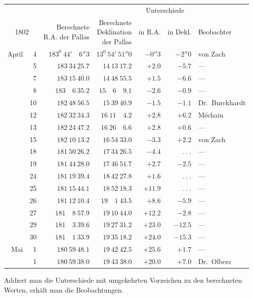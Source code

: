 \begin{center}
{\small\setlength{\tabcolsep}{3pt}
\begin{tabular}{r r|r|r|r|r|l}
\multicolumn{2}{c|}{}&&&\multicolumn{2}{c|}{Unterschiede}&\\
\multicolumn{2}{c|}{1802}&\shortstack{Berechnete\\R.A. der Pallas}&\shortstack{Berechnete\\Deklination\\der Pallas}&in R.A.&in Dekl.&Beobachter\\\hline
April&4&$183^0\ 44'\quad6''3$&$13^0\ 54'\ 51''0$&$-0''3$&$-2''0$&von Zach\\
&5&$183\ 34\ 25.7$&$14\ 13\ 17.2$&$+2.0$&$-5.7$&—\\
&7&$183\ 15\ 40.0$&$14\ 48\ 55.5$&$+1.5$&$-6.6$&—\\
&8&$183\quad6\ 35.2$&$15\quad6\quad9.1$&$-2.6$&$-0.9$&—\\
&10&$182\ 48\ 56.5$&$15\ 39\ 40.9$&$-1.5$&$-1.1$&Dr.\ Burckhardt\\
&12&$182\ 32\ 34.3$&$16\ 11\quad4.2$&$+2.8$&$+6.2$&Méchain\\
&13&$182\ 24\ 47.2$&$16\ 26\quad6.6$&$+2.8$&$+0.6$&—\\
&15&$182\ 10\ 13.2$&$16\ 54\ 33.0$&$-3.3$&$+2.2$&von Zach\\
&18&$181\ 50\ 26.2$&$17\ 34\ 26.5$&$-4.4$&$\ .\ .\ .$&—\\
&19&$181\ 44\ 28.0$&$17\ 46\ 51.7$&$+2.7$&$-2.5$&—\\
&24&$181\ 19\ 39.4$&$18\ 42\ 27.8$&$+1.6$&$\ .\ .\ .$&—\\
&25&$181\ 15\ 44.1$&$18\ 52\ 18.3$&$+11.9$&$\ .\ .\ .$&—\\
&26&$181\ 12\ 10.4$&$19\quad1\ 43.5$&$+8.6$&$-5.9$&—\\
&27&$181\quad8\ 57.9$&$19\ 10\ 44.0$&$+12.2$&$-2.8$&—\\
&29&$181\quad3\ 39.6$&$19\ 27\ 31.2$&$+23.0$&$-12.5$&—\\
&30&$181\quad1\ 33.9$&$19\ 35\ 18.2$&$+24.0$&$-15.3$&—\\
Mai&1&$180\ 59\ 48.1$&$19\ 42\ 42.5$&$+25.6$&$+1.7$&—\\
&1&$180\ 59\ 38.0$&$19\ 43\ 38.0$&$+20.0$&$+7.0$&Dr.\ Olbers
\end{tabular}}
\end{center}
Addiert man die Unterschiede mit umgekehrten Vorzeichen zu den berechneten Werten, erhält man die Beobachtungen.

